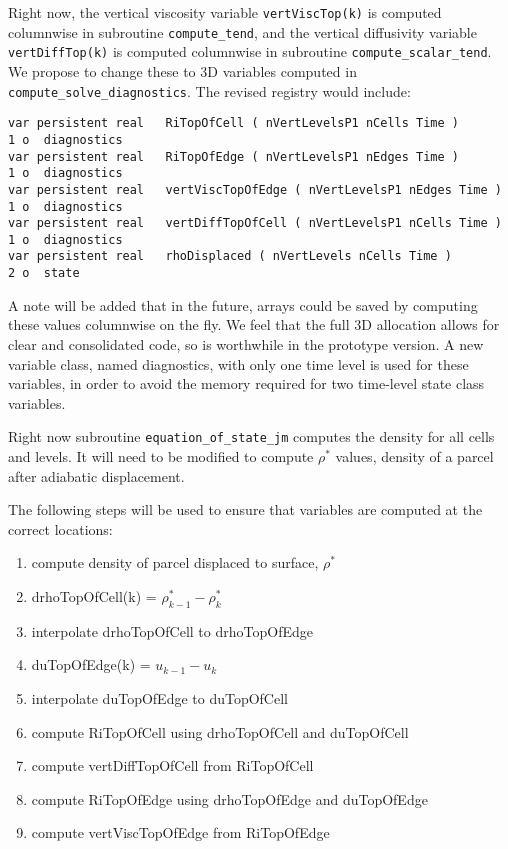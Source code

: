 \documentclass[11pt]{report}
\begin{document}
Right now, the vertical viscosity variable \verb=vertViscTop(k)= is computed columnwise in subroutine \verb=compute_tend=, and the vertical diffusivity variable \verb=vertDiffTop(k)= is computed columnwise in subroutine \verb=compute_scalar_tend=.  We propose to change these to 3D variables computed in \verb=compute_solve_diagnostics=.  The revised registry would include:

\begin{verbatim}
var persistent real   RiTopOfCell ( nVertLevelsP1 nCells Time )       1 o  diagnostics
var persistent real   RiTopOfEdge ( nVertLevelsP1 nEdges Time )       1 o  diagnostics
var persistent real   vertViscTopOfEdge ( nVertLevelsP1 nEdges Time ) 1 o  diagnostics
var persistent real   vertDiffTopOfCell ( nVertLevelsP1 nCells Time ) 1 o  diagnostics
var persistent real   rhoDisplaced ( nVertLevels nCells Time )        2 o  state
\end{verbatim}
A note will be added that in the future, arrays could be saved by computing these values columnwise on the fly.  We feel that the full 3D allocation allows for clear and consolidated code, so is worthwhile in the prototype version.  A new variable class, named diagnostics, with only one time level is used for these variables, in order to avoid the memory required for two time-level state class variables.

Right now subroutine \verb=equation_of_state_jm= computes the density for all cells and levels.  It will need to be modified to compute $\rho^*$ values, density of a parcel after adiabatic displacement.


The following steps will be used to ensure that variables are computed at the correct locations:
\begin{enumerate}
\item compute density of parcel displaced to surface, $\rho^*$
\item drhoTopOfCell(k) = $\rho^*_{k-1}-\rho^*_k$
\item interpolate drhoTopOfCell to drhoTopOfEdge
\item duTopOfEdge(k) = $u_{k-1}-u_k$
\item interpolate duTopOfEdge to duTopOfCell
\item compute RiTopOfCell using drhoTopOfCell and duTopOfCell
\item compute vertDiffTopOfCell from RiTopOfCell
\item compute RiTopOfEdge using drhoTopOfEdge and duTopOfEdge
\item compute vertViscTopOfEdge from RiTopOfEdge 
\end{enumerate}
\end{document}
